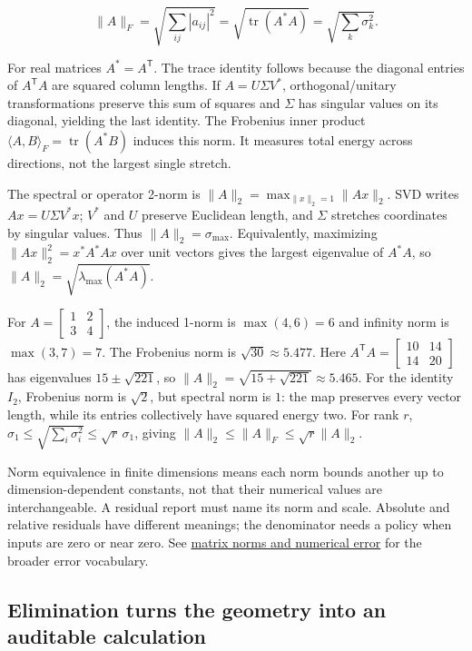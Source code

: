 \[
\|A\|_F=\sqrt{\sum_{ij}|a_{ij}|^2}
=\sqrt{\operatorname{tr}(A^*A)}
=\sqrt{\sum_k\sigma_k^2}.
\]

For real matrices \(A^*=A^\mathsf T\). The trace identity follows because the diagonal entries of \(A^\mathsf TA\) are squared column lengths. If \(A=U\Sigma V^*\), orthogonal/unitary transformations preserve this sum of squares and \(\Sigma\) has singular values on its diagonal, yielding the last identity. The Frobenius inner product \(\langle A,B\rangle_F=\operatorname{tr}(A^*B)\) induces this norm. It measures total energy across directions, not the largest single stretch.

The spectral or operator 2-norm is \(\|A\|_2=\max_{\|x\|_2=1}\|Ax\|_2\). SVD writes \(Ax=U\Sigma V^*x\); \(V^*\) and \(U\) preserve Euclidean length, and \(\Sigma\) stretches coordinates by singular values. Thus \(\|A\|_2=\sigma_{\max}\). Equivalently, maximizing \(\|Ax\|_2^2=x^*A^*Ax\) over unit vectors gives the largest eigenvalue of \(A^*A\), so \(\|A\|_2=\sqrt{\lambda_{\max}(A^*A)}\).

For \(A=\begin{bmatrix}1&2\\3&4\end{bmatrix}\), the induced 1-norm is \(\max(4,6)=6\) and infinity norm is \(\max(3,7)=7\). The Frobenius norm is \(\sqrt{30}\approx5.477\). Here \(A^\mathsf TA=\begin{bmatrix}10&14\\14&20\end{bmatrix}\) has eigenvalues \(15\pm\sqrt{221}\), so \(\|A\|_2=\sqrt{15+\sqrt{221}}\approx5.465\). For the identity \(I_2\), Frobenius norm is \(\sqrt2\), but spectral norm is \(1\): the map preserves every vector length, while its entries collectively have squared energy two. For rank \(r\), \(\sigma_1\le\sqrt{\sum_i\sigma_i^2}\le\sqrt r\,\sigma_1\), giving \(\|A\|_2\le\|A\|_F\le\sqrt r\|A\|_2\).

Norm equivalence in finite dimensions means each norm bounds another up to dimension-dependent constants, not that their numerical values are interchangeable. A residual report must name its norm and scale. Absolute and relative residuals have different meanings; the denominator needs a policy when inputs are zero or near zero. See \hyperref[01-foundations-i-ch019-matrix-norms-put-scale-into-error-statements]{matrix norms and numerical error} for the broader error vocabulary.

\subsection{Elimination turns the geometry into an auditable calculation}\label{01-foundations-i-ch019-elimination-turns-the-geometry-into-an-auditable-calculation}

